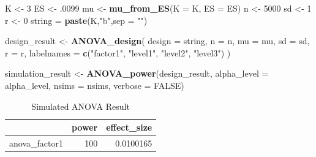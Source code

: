 \documentclass[]{book}
\newenvironment{Shaded}{\begin{snugshade}}{\end{snugshade}}
\newcommand{\DataTypeTok}[1]{\textcolor[rgb]{0.13,0.29,0.53}{#1}}
\newcommand{\DecValTok}[1]{\textcolor[rgb]{0.00,0.00,0.81}{#1}}
\newcommand{\FloatTok}[1]{\textcolor[rgb]{0.00,0.00,0.81}{#1}}
\newcommand{\KeywordTok}[1]{\textcolor[rgb]{0.13,0.29,0.53}{\textbf{#1}}}
\newcommand{\NormalTok}[1]{#1}
\newcommand{\OtherTok}[1]{\textcolor[rgb]{0.56,0.35,0.01}{#1}}
\newcommand{\StringTok}[1]{\textcolor[rgb]{0.31,0.60,0.02}{#1}}
\begin{document}
\begin{Shaded}
\begin{Highlighting}[]
\NormalTok{K <-}\StringTok{ }\DecValTok{3}
\NormalTok{ES <-}\StringTok{ }\FloatTok{.0099}
\NormalTok{mu <-}\StringTok{ }\KeywordTok{mu_from_ES}\NormalTok{(}\DataTypeTok{K =}\NormalTok{ K, }\DataTypeTok{ES =}\NormalTok{ ES)}
\NormalTok{n <-}\StringTok{ }\DecValTok{5000}
\NormalTok{sd <-}\StringTok{ }\DecValTok{1}
\NormalTok{r <-}\StringTok{ }\DecValTok{0}
\NormalTok{string =}\StringTok{ }\KeywordTok{paste}\NormalTok{(K,}\StringTok{"b"}\NormalTok{,}\DataTypeTok{sep =} \StringTok{""}\NormalTok{)}
\end{Highlighting}
\end{Shaded}

\begin{Shaded}
\begin{Highlighting}[]
\NormalTok{design_result <-}\StringTok{ }\KeywordTok{ANOVA_design}\NormalTok{(}
  \DataTypeTok{design =}\NormalTok{ string,}
  \DataTypeTok{n =}\NormalTok{ n,}
  \DataTypeTok{mu =}\NormalTok{ mu,}
  \DataTypeTok{sd =}\NormalTok{ sd,}
  \DataTypeTok{r =}\NormalTok{ r,}
  \DataTypeTok{labelnames =} \KeywordTok{c}\NormalTok{(}\StringTok{"factor1"}\NormalTok{, }\StringTok{"level1"}\NormalTok{, }\StringTok{"level2"}\NormalTok{, }\StringTok{"level3"}\NormalTok{)}
\NormalTok{  )}
\end{Highlighting}
\end{Shaded}

\begin{Shaded}
\begin{Highlighting}[]
\NormalTok{simulation_result <-}\StringTok{ }\KeywordTok{ANOVA_power}\NormalTok{(design_result, }
                                 \DataTypeTok{alpha_level =}\NormalTok{ alpha_level, }
                                 \DataTypeTok{nsims =}\NormalTok{ nsims,}
                                 \DataTypeTok{verbose =} \OtherTok{FALSE}\NormalTok{)}
\end{Highlighting}
\end{Shaded}

\begin{table}[!h]

\caption{\label{tab:unnamed-chunk-80}Simulated ANOVA Result}
\centering
\begin{tabular}{l|r|r}
\hline
  & power & effect\_size\\
\hline
anova\_factor1 & 100 & 0.0100165\\
\hline
\end{tabular}
\end{table}
\end{document}

